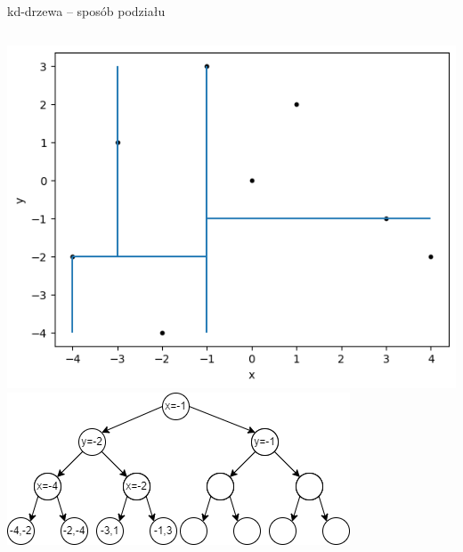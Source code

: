 \documentclass[aspectratio=169,dvipsnames]{beamer}
\begin{document}
\begin{frame}{kd-drzewa -- sposób podziału}
    \begin{columns}
        \includegraphics[width=\textwidth]{images/plots/6}
        \includegraphics[width=\textwidth]{images/trees/8.drawio}
    \end{columns}
\end{frame}
\end{document}
